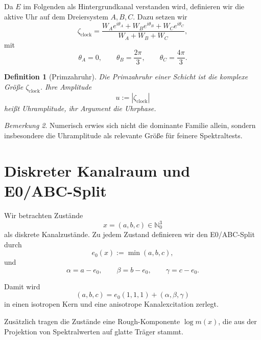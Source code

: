\documentclass[11pt,a4paper]{article}
\newtheorem{definition}{Definition}[section]
\theoremstyle{remark}
\newtheorem{bemerkung}[definition]{Bemerkung}
\newcommand{\N}{\mathbb{N}}
\begin{document}
	Da $E$ im Folgenden als Hintergrundkanal verstanden wird, definieren wir die aktive Uhr auf dem Dreiersystem $A,B,C$. Dazu setzen wir
	\begin{equation}
		\zeta_{\mathrm{clock}} = \frac{W_A e^{i\theta_A}+W_B e^{i\theta_B}+W_C e^{i\theta_C}}{W_A+W_B+W_C},
	\end{equation}
	mit
	\begin{equation}
		\theta_A=0,
		\qquad
		\theta_B=\frac{2\pi}{3},
		\qquad
		\theta_C=\frac{4\pi}{3}.
	\end{equation}
	
	\begin{definition}[Primzahruhr]
		Die \emph{Primzahruhr} einer Schicht ist die komplexe Größe $\zeta_{\mathrm{clock}}$. Ihre Amplitude
		\begin{equation}
			u := |\zeta_{\mathrm{clock}}|
		\end{equation}
		heißt Uhramplitude, ihr Argument die Uhrphase.
	\end{definition}
	
	\begin{bemerkung}
		Numerisch erwies sich nicht die dominante Familie allein, sondern insbesondere die Uhramplitude als relevante Größe für feinere Spektraltests.
	\end{bemerkung}
	
	\section{Diskreter Kanalraum und E0/ABC-Split}
	
	Wir betrachten Zustände
	\begin{equation}
		x=(a,b,c)\in\N_0^3
	\end{equation}
	als diskrete Kanalzustände. Zu jedem Zustand definieren wir den E0/ABC-Split durch
	\begin{equation}
		e_0(x):=\min(a,b,c),
	\end{equation}
	und
	\begin{equation}
		\alpha=a-e_0,
		\qquad
		\beta=b-e_0,
		\qquad
		\gamma=c-e_0.
	\end{equation}
	
	Damit wird
	\begin{equation}
		(a,b,c)=e_0(1,1,1)+(\alpha,\beta,\gamma)
	\end{equation}
	in einen isotropen Kern und eine anisotrope Kanalexcitation zerlegt.
	
	Zusätzlich tragen die Zustände eine Rough-Komponente $\log m(x)$, die aus der Projektion von Spektralwerten auf glatte Träger stammt.
	
\end{document}
